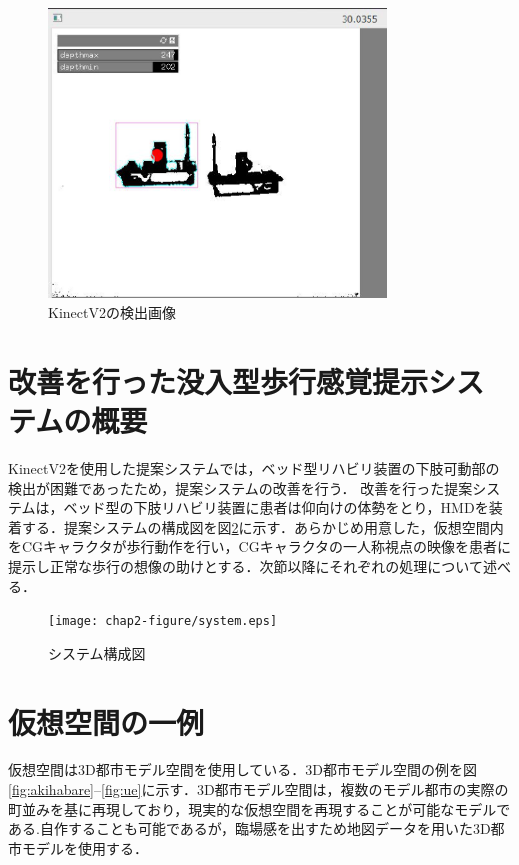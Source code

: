 \begin{figure}[tbp]
	\centering
			\includegraphics[width=0.8\textwidth]{chap2-figure/kinectsystem.eps}
	\caption{KinectV2の検出画像}
	\label{fig:kinectsystemarc}
\end{figure}


\section{改善を行った没入型歩行感覚提示システムの概要}
KinectV2を使用した提案システムでは，ベッド型リハビリ装置の下肢可動部の検出が困難であったため，提案システムの改善を行う．
改善を行った提案システムは，ベッド型の下肢リハビリ装置に患者は仰向けの体勢をとり，HMDを装着する．提案システムの構成図を図\ref{fig:systemarc}に示す．あらかじめ用意した，仮想空間内をCGキャラクタが歩行動作を行い，CGキャラクタの一人称視点の映像を患者に提示し正常な歩行の想像の助けとする．次節以降にそれぞれの処理について述べる．

\begin{figure}[tbp]
	\centering
			\texttt{[image: chap2-figure/system.eps]}
	\caption{システム構成図}
	\label{fig:systemarc}
\end{figure}

\section{仮想空間の一例}
仮想空間は3D都市モデル空間を使用している．3D都市モデル空間の例を図\ref{fig:akihabare}--\ref{fig:ue}に示す．3D都市モデル空間は，複数のモデル都市の実際の町並みを基に再現しており，現実的な仮想空間を再現することが可能なモデルである.自作することも可能であるが，臨場感を出すため地図データを用いた3D都市モデルを使用する．

